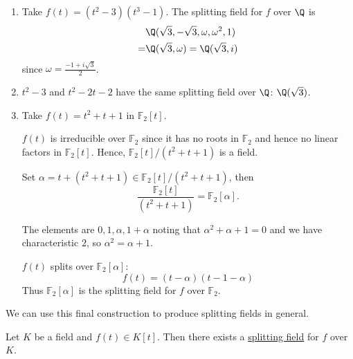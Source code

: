 \documentclass{article}
\begin{document}
\begin{eg}
\begin{enumerate}
        \item Take $f(t) = (t^2 - 3)(t^3 - 1)$. The splitting field for $f$ over $\Q$ is
            \begin{align*}
                &\Q(\sqrt{3}, -\sqrt{3}, \omega, \omega^2, 1) \\
                = &\Q(\sqrt{3}, \omega) = \Q(\sqrt{3}, i)
            \end{align*}
            since $\omega = \frac{-1 + i \sqrt{3}}{2}$.
        \item $t^2 - 3$ and $t^2 - 2t - 2$ have the same splitting field over $\Q$: $\Q(\sqrt{3})$.
        \item Take $f(t) = t^2 + t + 1$ in $\mathbb{F}_2[t]$.

            $f(t)$ is irreducible over $\mathbb{F}_2$ since it has no roots in $\mathbb{F}_2$ and hence no linear factors in $\mathbb{F}_2[t]$.
            Hence, $\mathbb{F}_2[t]/(t^2 + t + 1)$ is a field.

            Set $\alpha = t + (t^2 + t + 1) \in \mathbb{F}_2[t]/(t^2 + t + 1)$, then
            \begin{equation*}
                \frac{\mathbb{F}_2[t]}{(t^2 + t + 1)} = \mathbb{F}_2[\alpha].
            \end{equation*}

            The elements are $0, 1, \alpha, 1+\alpha$ noting that $\alpha^2 + \alpha + 1 = 0$ and we have characteristic $2$, so $\alpha^2 = \alpha + 1$.

            $f(t)$ splits over $\mathbb{F}_2[\alpha]$:
            \begin{equation*}
                f(t) = (t-\alpha)(t-1-\alpha)
            \end{equation*}
            Thus $\mathbb{F}_2[\alpha]$ is the splitting field for $f$ over $\mathbb{F}_2$.
    \end{enumerate}
\end{eg}
We can use this final construction to produce splitting fields in general.

\begin{nthm}\label{thm:1.23}
    Let $K$ be a field and $f(t) \in K[t]$. Then there exists a \hyperlink{def:splitting}{splitting field} for $f$ over $K$.
\end{nthm}
\end{document}
